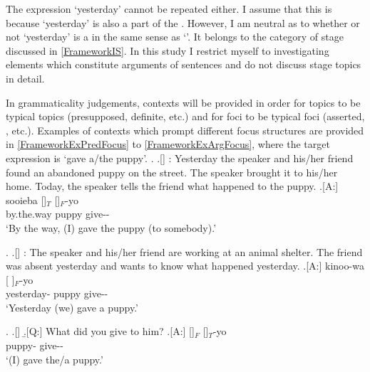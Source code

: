 The expression  `yesterday' cannot be repeated either.
I assume that this is because  `yesterday' is also a part of the .
However, I am neutral as to whether or not  `yesterday' is a 
in the same sense as  `'.
It belongs to the category of stage  discussed in \ref{FrameworkIS}.%
 In this study I restrict myself to investigating elements which constitute arguments of sentences
and do not discuss stage topics in detail.

In grammaticality judgements,
contexts will be provided
in order for topics to be typical topics (presupposed, definite, etc.)
and for foci to be typical foci (asserted, , etc.).
Examples of contexts which prompt different focus structures are provided in \ref{FrameworkExPredFocus} to \ref{FrameworkExArgFocus},
where the target expression is  `gave a/the puppy'.
%
	\ex. \label{FrameworkExPredFocus}
	\a.[] : Yesterday the speaker and his/her friend found an abandoned puppy on the street. The speaker brought it to his/her home. Today, the speaker tells the friend what happened to the puppy.
	\bg.[A:] sooieba []$_{T}$ []$_{F}$-yo \\
		by.the.way puppy give-- \\
		`By the way, (I) gave the puppy (to somebody).'

		\ex. \label{FrameworkExSentFocus}
		\a.[] : The speaker and his/her friend are working at an animal shelter. The friend was absent yesterday and wants to know what happened yesterday.
		\bg.[A:] kinoo-wa [ ]$_{F}$-yo \\
		yesterday- puppy give-- \\
		`Yesterday (we) gave a puppy.'

\ex. \label{FrameworkExArgFocus}\a.[] 
	\b.[Q:] What did you give to him?
	\bg.[A:] []$_{F}$ []$_{T}$-yo \\
			 puppy- give-- \\
			`(I) gave the/a puppy.'

